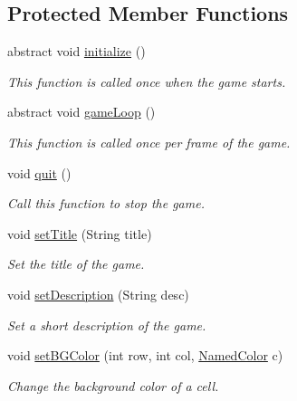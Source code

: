 \subsection*{Protected Member Functions}
\begin{DoxyCompactItemize}
\item 
abstract void \mbox{\hyperlink{classbridges_1_1games_1_1_game_base_a973a52d5eee7c29b01d668fba3c61657}{initialize}} ()
\begin{DoxyCompactList}\small\item\em This function is called once when the game starts. \end{DoxyCompactList}\item 
abstract void \mbox{\hyperlink{classbridges_1_1games_1_1_game_base_a56d05ed744791cfc1c3792f39ff438f1}{game\+Loop}} ()
\begin{DoxyCompactList}\small\item\em This function is called once per frame of the game. \end{DoxyCompactList}\item 
void \mbox{\hyperlink{classbridges_1_1games_1_1_game_base_aa16a69dc83ee4e32150188e8acf1f897}{quit}} ()
\begin{DoxyCompactList}\small\item\em Call this function to stop the game. \end{DoxyCompactList}\item 
void \mbox{\hyperlink{classbridges_1_1games_1_1_game_base_a9f55e84af9bbf6497b314181c9d79f0a}{set\+Title}} (String title)
\begin{DoxyCompactList}\small\item\em Set the title of the game. \end{DoxyCompactList}\item 
void \mbox{\hyperlink{classbridges_1_1games_1_1_game_base_a3df3bee5b9d32cc9f164d06f9e9707dc}{set\+Description}} (String desc)
\begin{DoxyCompactList}\small\item\em Set a short description of the game. \end{DoxyCompactList}\item 
void \mbox{\hyperlink{classbridges_1_1games_1_1_game_base_a7b4d08cdb306a5bf7104ab5315acb414}{set\+B\+G\+Color}} (int row, int col, \mbox{\hyperlink{enumbridges_1_1base_1_1_named_color}{Named\+Color}} c)
\begin{DoxyCompactList}\small\item\em Change the background color of a cell. \end{DoxyCompactList}\item 

\end{DoxyCompactItemize}
